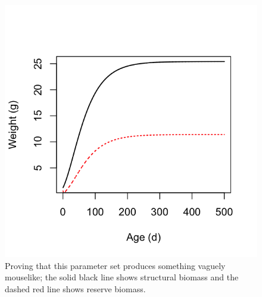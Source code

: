 \documentclass[12pt,reqno,final,pdftex]{amsart}\usepackage[]{graphicx}\usepackage[]{color}
\newenvironment{knitrout}{}{} %
\theoremstyle{plain}
\numberwithin{equation}{part}
\begin{document}
\begin{knitrout}
\begin{figure}
\includegraphics[width=\linewidth]{figure/unnamed-chunk-2-1} \hfill{}

\caption[Proving that this parameter set produces something vaguely mouselike]{Proving that this parameter set produces something vaguely mouselike; the solid black line shows structural biomass and the dashed red line shows reserve biomass.\label{fig:unnamed-chunk-2}}
\end{figure}


\end{knitrout}



\end{document}
